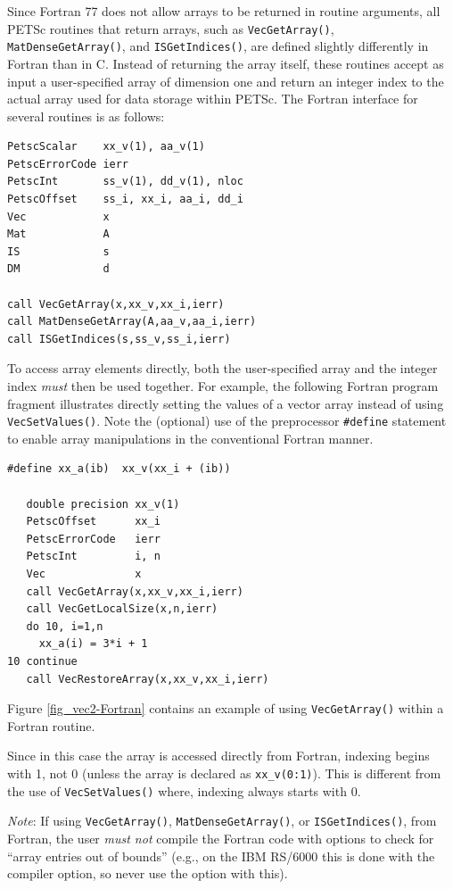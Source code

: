 Since Fortran 77 does not allow arrays to be returned in routine
arguments, all PETSc routines that return arrays, such as
\lstinline{VecGetArray()}, \lstinline{MatDenseGetArray()},
and \lstinline{ISGetIndices()},
are defined slightly differently in Fortran than in C.
Instead of returning the array itself, these routines
accept as input a user-specified array of dimension one and return an
integer index to the actual array used for data storage within PETSc.
The Fortran interface for several routines is as follows:
\begin{lstlisting}
PetscScalar    xx_v(1), aa_v(1)
PetscErrorCode ierr
PetscInt       ss_v(1), dd_v(1), nloc
PetscOffset    ss_i, xx_i, aa_i, dd_i
Vec            x
Mat            A
IS             s
DM             d

call VecGetArray(x,xx_v,xx_i,ierr)
call MatDenseGetArray(A,aa_v,aa_i,ierr)
call ISGetIndices(s,ss_v,ss_i,ierr)
\end{lstlisting}

To access array elements directly, both the user-specified array and
the integer index {\em must} then be used together.
For example, the following Fortran program fragment illustrates
directly setting the values of a vector array instead of using \lstinline{VecSetValues()}.  Note the (optional) use of the preprocessor
\lstinline{#define} statement to enable array manipulations in the conventional
Fortran manner.
\begin{lstlisting}
#define xx_a(ib)  xx_v(xx_i + (ib))

   double precision xx_v(1)
   PetscOffset      xx_i
   PetscErrorCode   ierr
   PetscInt         i, n
   Vec              x
   call VecGetArray(x,xx_v,xx_i,ierr)
   call VecGetLocalSize(x,n,ierr)
   do 10, i=1,n
     xx_a(i) = 3*i + 1
10 continue
   call VecRestoreArray(x,xx_v,xx_i,ierr)
\end{lstlisting}
Figure \ref{fig_vec2-Fortran} contains an example of using \lstinline{VecGetArray()}
within a Fortran routine.

Since in this case the array is accessed directly from Fortran,
indexing begins with 1, not 0 (unless the array is declared as \lstinline{xx_v(0:1)}).
This is different from the use of \lstinline{VecSetValues()}
where, indexing always starts with 0.

{\em Note}: If using \lstinline{VecGetArray()}, \lstinline{MatDenseGetArray()}, or \lstinline{ISGetIndices()},
from Fortran, the user {\em must not} compile the Fortran code with options
to check for ``array entries out of bounds'' (e.g., on the IBM RS/6000 this
is done with the  compiler option, so never use the  option with this).


